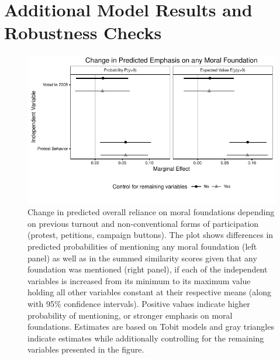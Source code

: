\documentclass[12pt]{article}
\begin{document}
\clearpage
\section{Additional Model Results and Robustness Checks}\label{app:robust}
\renewcommand\thefigure{\thesection.\arabic{figure}}
\renewcommand\thetable{\thesection.\arabic{table}}
\setcounter{figure}{0}
\setcounter{table}{0}


\begin{figure}[h]\centering
\includegraphics{../calc/fig/tobit_learn_participation.pdf}
\caption{Change in predicted overall reliance on moral foundations depending on previous turnout and non-conventional forms of participation (protest, petitions, campaign buttons). The plot shows differences in predicted probabilities of mentioning any moral foundation (left panel) as well as in the summed similarity scores given that any foundation was mentioned (right panel), if each of the independent variables is increased from its minimum to its maximum value holding all other variables constant at their respective means (along with 95\% confidence intervals). Positive values indicate higher probability of mentioning, or stronger emphasis on moral foundations. Estimates are based on Tobit models and gray triangles indicate estimates while additionally controlling for the remaining variables presented in the figure. %
}\label{fig:tobit_learn_participation}
\end{figure}
\end{document}
